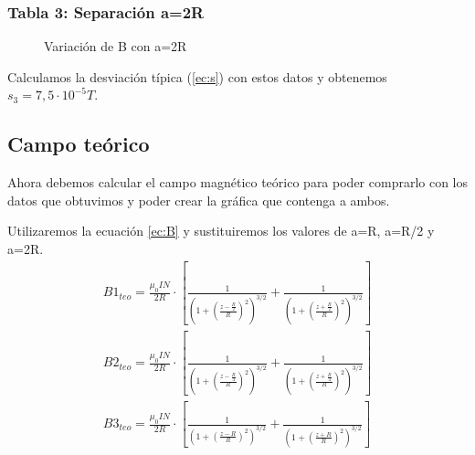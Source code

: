 \documentclass[12pt, a4paper, titlepage]{article}
\begin{document}
  \begin{minipage}{0.49\textwidth}
    \subsubsection{Tabla 3: Separación a=2R}

    \begin{figure}[H]
      \begin{table}[H]
         \quad
      \end{table}
      \caption{Variación de B con a=2R}
    \end{figure}

    Calculamos la desviación típica (\ref{ec:s}) con estos datos y obtenemos $s_3 = 7,5 \cdot 10^{-5} T$.
  \end{minipage}

  \newpage
  \subsection{Campo teórico}

  Ahora debemos calcular el campo magnético teórico para poder comprarlo con los datos que obtuvimos y poder crear la gráfica que contenga a ambos.

  Utilizaremos la ecuación \ref{ec:B} y sustituiremos los valores de a=R, a=R/2 y a=2R.
  \begin{gather*}
    B1_{teo} = \frac{\mu_0 I N}{2R} \cdot \left[\frac{1}{\left(1 + \left(\frac{z - \frac{R}{2}}{R}\right)^2 \right)^{3/2}} + \frac{1}{\left(1 + \left(\frac{z + \frac{R}{2}}{R}\right)^2 \right)^{3/2}}\right] \nonumber \\
    B2_{teo} = \frac{\mu_0 I N}{2R} \cdot \left[\frac{1}{\left(1 + \left(\frac{z - \frac{R}{4}}{R}\right)^2 \right)^{3/2}} + \frac{1}{\left(1 + \left(\frac{z + \frac{R}{4}}{R}\right)^2 \right)^{3/2}}\right] \nonumber \\
    B3_{teo} = \frac{\mu_0 I N}{2R} \cdot \left[\frac{1}{\left(1 + \left(\frac{z - R}{R}\right)^2 \right)^{3/2}} + \frac{1}{\left(1 + \left(\frac{z + R}{R}\right)^2 \right)^{3/2}}\right] \nonumber
  \end{gather*}
\end{document}
